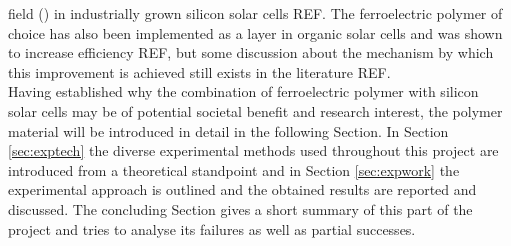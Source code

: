 field (\bfs{}) in industrially grown silicon solar cells REF. The ferroelectric polymer of choice has also been implemented as a  layer in organic solar cells and was shown to increase efficiency REF, but some discussion about the mechanism by which this improvement is achieved still exists in the literature REF.\\
Having established why the combination of ferroelectric polymer with silicon solar cells may be of potential societal benefit and research interest, the polymer material will be introduced in detail in the following Section. In Section \ref{sec:exptech} the diverse experimental methods used throughout this project are introduced from a theoretical standpoint and in Section \ref{sec:expwork} the experimental approach is outlined and the obtained results are reported and discussed. The concluding Section gives a short summary of this part of the project and tries to analyse its failures as well as partial successes.


